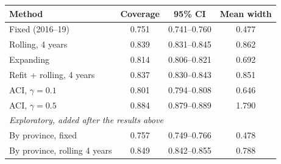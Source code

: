 \begin{tabular}{lccc}
\toprule
Method & Coverage & 95\% CI & Mean width \\
\midrule
Fixed (2016--19) & 0.751 & 0.741--0.760 & 0.477 \\
Rolling, 4 years & 0.839 & 0.831--0.845 & 0.862 \\
Expanding & 0.814 & 0.806--0.821 & 0.692 \\
Refit + rolling, 4 years & 0.837 & 0.830--0.843 & 0.851 \\
ACI, $\gamma=0.1$ & 0.801 & 0.794--0.808 & 0.646 \\
ACI, $\gamma=0.5$ & 0.884 & 0.879--0.889 & 1.790 \\
\midrule
\multicolumn{4}{l}{\emph{Exploratory, added after the results above}} \\
By province, fixed & 0.757 & 0.749--0.766 & 0.478 \\
By province, rolling 4 years & 0.849 & 0.842--0.855 & 0.788 \\
\bottomrule
\end{tabular}
